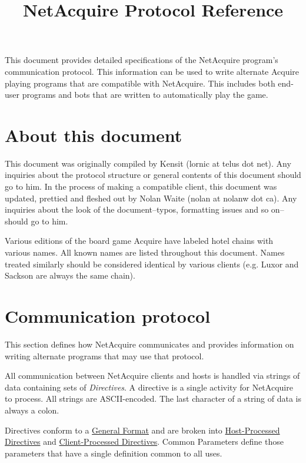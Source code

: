 \documentclass{article}
\title{NetAcquire Protocol Reference}
\author{}
\date{}
\begin{document}
\maketitle

This document provides detailed specifications of the NetAcquire program's communication protocol. This information can be used to write alternate Acquire playing programs that are compatible with NetAcquire. This includes both end-user programs and bots that are written to automatically play the game.

\tableofcontents

\section{About this document} %
\label{sec:about_this_document}

This document was originally compiled by Kensit (lornic at telus dot net). Any inquiries about the protocol structure or general contents of this document should go to him. In the process of making a compatible client, this document was updated, prettied and fleshed out by Nolan Waite (nolan at nolanw dot ca). Any inquiries about the look of the document--typos, formatting issues and so on--should go to him.

Various editions of the board game Acquire have labeled hotel chains with various names. All known names are listed throughout this document. Names treated similarly should be considered identical by various clients (e.g. Luxor and Sackson are always the same chain).


\section{Communication protocol} %
\label{sec:communication_protocol}

This section defines how NetAcquire communicates and provides information on writing alternate programs that may use that protocol.

All communication between NetAcquire clients and hosts is handled via strings of data containing sets of \emph{Directives}. A directive is a single activity for NetAcquire to process. All strings are ASCII-encoded. The last character of a string of data is always a colon.

Directives conform to a \hyperref[sub:general_format]{General Format} and are broken into \hyperref[sub:host_processed_directives]{Host-Processed Directives} and \hyperref[sub:client_processed_directives]{Client-Processed Directives}. Common Parameters define those parameters that have a single definition common to all uses.
\end{document}
